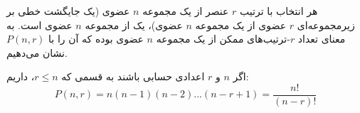 \begin{definition}
    \p
    هر انتخاب با ترتیب
    $r$
    عنصر از یک مجموعه
    $n$
    عضوی
    (یک جایگشت خطی بر زیرمجموعه‌ای 
    $r$
    عضوی از یک مجموعه
    $n$
    عضوی)،
    یک
    از مجموعه
    $n$
    عضوی است.
    به معنای تعداد
    $r$-ترتیب‌های ممکن
    از یک مجموعه $n$ عضوی
    بوده که آن را با 
    $P(n,r)$ نشان می‌دهیم. 
\end{definition}

\begin{fact}
    \p
    اگر $n$ و $r$ اعدادی حسابی باشند به قسمی که 
    $r\leq n$، داریم:
    $$P(n,r) = n(n-1)(n-2)...(n-r+1) = \frac{n!}{(n-r)!}$$
\end{fact}


